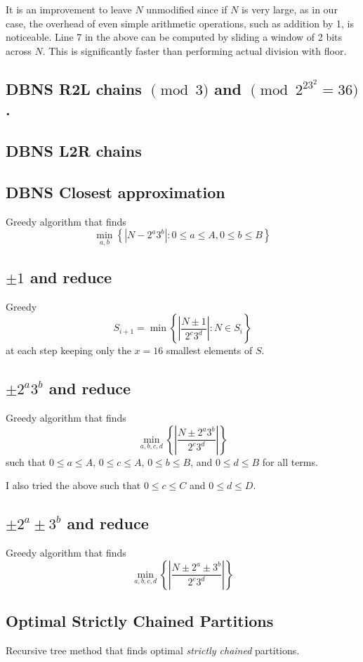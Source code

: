 \documentclass[11pt, letterpaper]{article}
\theoremstyle{definition}
\begin{document}
\bigbreak
It is an improvement to leave $N$ unmodified since if $N$ is very large, as in our case, the overhead of even simple arithmetic operations, such as addition by 1, is noticeable.  Line 7 in the above can be computed by sliding a window of 2 bits across $N$.  This is significantly faster than performing actual division with floor.

\subsection{DBNS R2L chains $\pmod 3$ and $\pmod {2^23^2 = 36}$.}
\subsection{DBNS L2R chains}
\subsection{DBNS Closest approximation}
Greedy algorithm that finds
\[
	\min_{a,b} \left\{|N-2^a3^b| : 0 \le a \le A, 0 \le b \le B\right\}
\]

\subsection{$\pm 1$ and reduce}
Greedy 
\[
	S_{i+1} = \min \left\{ \left| \frac{N \pm 1}{2^c3^d} \right| : N \in S_i \right\}
\]
at each step keeping only the $x=16$ smallest elements of $S$.

\subsection{$\pm 2^a3^b$ and reduce}
Greedy algorithm that finds
\[
	\min_{a,b,c,d} \left\{\left| \frac{N \pm 2^a3^b}{2^c3^d} \right| \right\}
\]
such that $0 \le a \le A$, $0 \le c \le A$, $0 \le b \le B$, and $0 \le d \le B$ for all terms.

I also tried the above such that $0 \le c \le C$ and $0 \le d \le D$.

\subsection{$\pm 2^a \pm 3^b$ and reduce}
Greedy algorithm that finds
\[
	\min_{a,b,c,d} \left\{\left| \frac{N \pm 2^a \pm 3^b}{2^c3^d} \right| \right\}
\]

\subsection{Optimal Strictly Chained Partitions}
Recursive tree method that finds optimal \emph{strictly chained} partitions.
\end{document}
